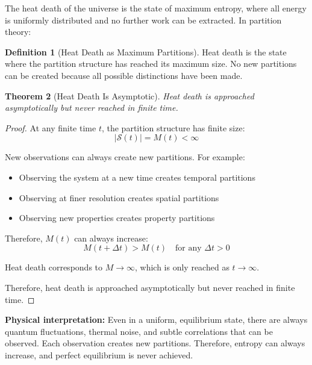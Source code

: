 \documentclass[twocolumn,10pt]{article}
\newtheorem{theorem}{Theorem}[section]
\theoremstyle{definition}
\newtheorem{definition}[theorem]{Definition}
\theoremstyle{remark}
\begin{document}
The heat death of the universe\cite{clausius1867} is the state of maximum entropy, where all energy is uniformly distributed and no further work can be extracted. In partition theory:

\begin{definition}[Heat Death as Maximum Partitions]
\label{def:heat_death}
Heat death is the state where the partition structure has reached its maximum size. No new partitions can be created because all possible distinctions have been made.
\end{definition}

\begin{theorem}[Heat Death Is Asymptotic]
\label{thm:heat_death_asymptotic}
Heat death is approached asymptotically but never reached in finite time.
\end{theorem}

\begin{proof}
At any finite time $t$, the partition structure has finite size:
\begin{equation}
|\mathcal{S}(t)| = M(t) < \infty
\end{equation}

New observations can always create new partitions. For example:
\begin{itemize}
\item Observing the system at a new time creates temporal partitions
\item Observing at finer resolution creates spatial partitions
\item Observing new properties creates property partitions
\end{itemize}

Therefore, $M(t)$ can always increase:
\begin{equation}
M(t + \Delta t) > M(t) \quad \text{for any } \Delta t > 0
\end{equation}

Heat death corresponds to $M \to \infty$, which is only reached as $t \to \infty$.

Therefore, heat death is approached asymptotically but never reached in finite time.
\end{proof}

\noindent\textbf{Physical interpretation:} Even in a uniform, equilibrium state, there are always quantum fluctuations, thermal noise, and subtle correlations that can be observed. Each observation creates new partitions. Therefore, entropy can always increase, and perfect equilibrium is never achieved.
\end{document}
